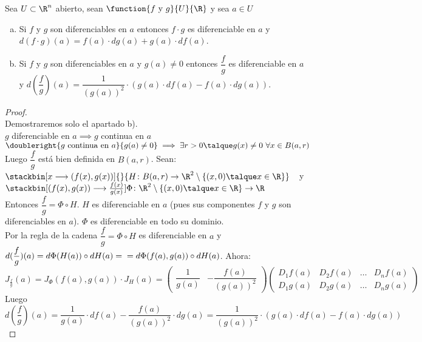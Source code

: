 	\begin{proposicion} Sea $U\subset \R^n$ abierto, sean $\function{f\mathrm{\ y\ }g}{U}{\R}$ y sea $a\in U$
	\begin{enumerate}[a)]
	\item Si $f$ y $g$ son diferenciables en $a$ entonces $f\cdot g$ es diferenciable en $a$ y $d(f\cdot g)(a)=f(a)\cdot dg(a)+g(a)\cdot df(a)$.
	\item Si $f$ y $g$ son diferenciables en $a$ y $g(a)\neq 0$ entonces $\dfrac{f}{g}$ es diferenciable en $a$ y $d\left(\dfrac{f}{g}\right)(a)=\dfrac{1}{(g(a))^2}\cdot (g(a)\cdot df(a)-f(a)\cdot dg(a))$.
	\end{enumerate}
	\begin{proof}\ \\
	Demostraremos solo el apartado b).\\
	$g$ diferenciable en $a\implies g$ continua en $a$\\
	$\doubleright{g\mathrm{\ continua\ en\ }a}{g(a)\neq 0}\implies\exists r>0\talque g(x)\neq 0\ \forall x\in B(a,r)$\\
	Luego $\dfrac{f}{g}$ está bien definida en $B(a,r)$. Sean:\\
	$\stackbin[x\longrightarrow(f(x),g(x))]{}{H\colon B(a,r)\rightarrow\R^2\setminus\{(x,0)\talque x\in \R\}}\ \ $ y \\ $\stackbin[(f(x),g(x))\longrightarrow\frac{f(x)}{g(x)}]{}{\Phi\colon\R^2\setminus\{(x,0)\talque x\in \R\}\rightarrow \R}$\\
	Entonces $\dfrac{f}{g}=\Phi\circ H$. $H$ es diferenciable en $a$ (pues sus componentes $f$ y $g$ son diferenciables en $a$). $\Phi$ es diferenciable en todo su dominio.\\
	Por la regla de la cadena $\dfrac{f}{g}=\Phi\circ H$ es diferenciable en $a$ y $d(\dfrac{f}{g})(a)=d\Phi(H(a))\circ dH(a)=\\=d\Phi(f(a),g(a))\circ dH(a)$. Ahora:\\
	$J_{\frac{f}{g}}(a)=J_\Phi(f(a),g(a))\cdot J_H(a)=\begin{pmatrix} \dfrac{1}{g(a)}&-\dfrac{f(a)}{(g(a))^2}\end{pmatrix}\begin{pmatrix}D_1f(a)&D_2f(a)&\hdots&D_nf(a)\\D_1g(a)&D_2g(a)&\hdots&D_ng(a)\end{pmatrix}$\\
	Luego $d(\dfrac{f}{g})(a)=\dfrac{1}{g(a)}\cdot df(a)-\dfrac{f(a)}{(g(a))^2}\cdot dg(a)=\dfrac{1}{(g(a))^2}\cdot(g(a)\cdot df(a)-f(a)\cdot dg(a))$
	\end{proof}
	\end{proposicion}
	
